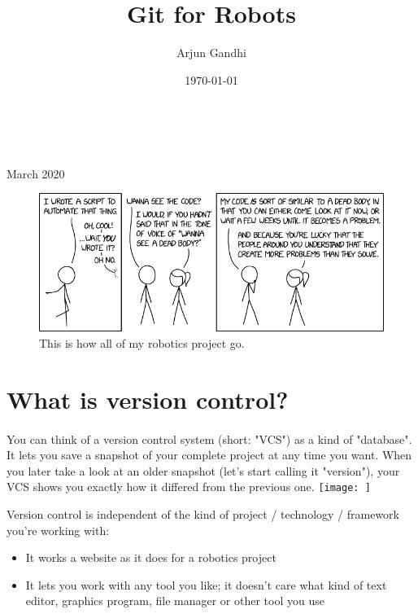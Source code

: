 \documentclass{article}
\title{Git for Robots}
\author{Arjun Gandhi}
\date{\today}
\begin{document}
\begin{titlepage}
		\\
			
		\vspace{10mm}
		\\
		\vspace{\fill}
		\centering \large{March 2020}
\end{titlepage}


\newpage{}
\thispagestyle {empty}

\vspace*{2cm}

\begin{figure}
		\includegraphics[width=5.5in]{images/wanna_see_the_code.png}
		\caption{This is how all of my robotics project go.}
\end{figure}

\newpage

\tableofcontents

\newpage
\section{What is version control?}
\paragraph{}
    You can think of a version control system (short: "VCS") as a kind of "database". It lets you save a snapshot of your complete project at any time you want. When you later take a look at an older snapshot (let's start calling it "version"), your VCS shows you exactly how it differed from the previous one.
    \texttt{[image: ]}
    
    
    Version control is independent of the kind of project / technology / framework you're working with:
    \begin{itemize}
        \item It works a website as it does for a robotics project
        \item It lets you work with any tool you like; it doesn't care what kind of text editor, graphics program, file manager or other tool you use
    \end{itemize}
\end{document}
